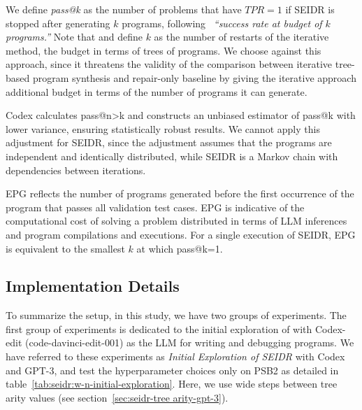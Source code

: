 We define \emph{pass@k} as the number of problems that have $TPR=1$ if SEIDR is stopped after generating $k$ programs, following~\cite{kulal2019:spoc} \emph{``success rate at budget of $k$ programs.''}
Note that \cite{jiangSelfEvolveCodeEvolution2023} and \cite{chenTeachingLargeLanguage2023} define $k$ as the number of restarts of the iterative method, the budget in terms of trees of programs.
We choose against this approach, since it threatens the validity of the comparison between iterative tree-based program synthesis and repair-only baseline by giving the iterative approach additional budget in terms of the number of programs it can generate.

Codex \cite{chenEvaluatingLargeLanguage2021} calculates pass@n>k and constructs an unbiased estimator of pass@k with lower variance, ensuring statistically robust results.
We cannot apply this adjustment for SEIDR, since the adjustment assumes that the programs are independent and identically distributed, while SEIDR is a Markov chain with dependencies between iterations. 

EPG reflects the number of programs generated before the first occurrence of the program that passes all validation test cases.
EPG is indicative of the computational cost of solving a problem distributed in terms of LLM inferences and program compilations and executions.
For a single execution of SEIDR, EPG is equivalent to the smallest $k$ at which pass@k=1.

\newpage\subsection{Implementation Details}
\label{sec:seidr-implementation}


To summarize the setup, in this study, we have two groups of experiments. 
% 
The first group of experiments is dedicated to the initial exploration of \rqtreearity{}
with Codex-edit (code-davinci-edit-001) as the LLM for writing and debugging programs. 
We have referred to these experiments as \emph{Initial Exploration of SEIDR} with Codex and GPT-3, and test the hyperparameter choices only on PSB2 as detailed in table~\ref{tab:seidr:w-n-initial-exploration}.
Here, we use wide steps between tree arity values (see section~\ref{sec:seidr-tree arity-gpt-3}).
 
